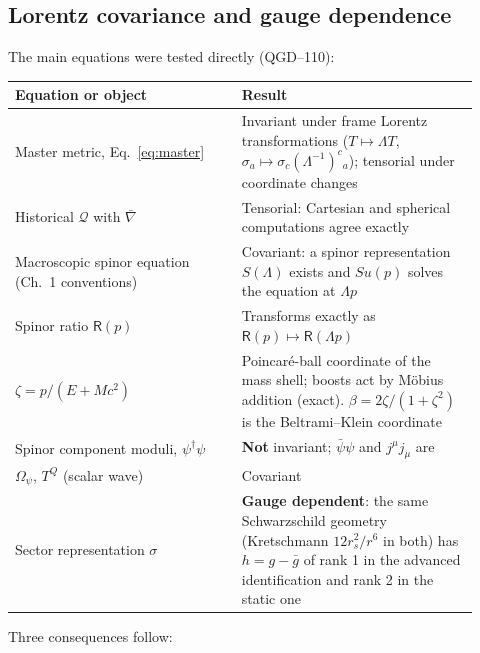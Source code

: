 \documentclass[11pt,a4paper]{article}
\begin{document}
\subsection{Lorentz covariance and gauge dependence}
The main equations were tested directly (QGD--110):
\begin{center}\small
\begin{tabular}{@{}p{0.45\linewidth}p{0.47\linewidth}@{}}\toprule
Equation or object & Result\\\midrule
Master metric, Eq.~\eqref{eq:master} & Invariant under frame Lorentz transformations ($T\mapsto\Lambda T$, $\sigma_a\mapsto\sigma_c(\Lambda^{-1})^c{}_a$); tensorial under coordinate changes\\
Historical $\mathcal Q$ with $\bar\nabla$ & Tensorial: Cartesian and spherical computations agree exactly\\
Macroscopic spinor equation (Ch.~1 conventions) & Covariant: a spinor representation $S(\Lambda)$ exists and $S u(p)$ solves the equation at $\Lambda p$\\
Spinor ratio $\mathsf R(p)$ & Transforms exactly as $\mathsf R(p)\mapsto\mathsf R(\Lambda p)$\\
$\zeta=p/(E+Mc^2)$ & Poincar\'e-ball coordinate of the mass shell; boosts act by M\"obius addition (exact). $\beta=2\zeta/(1+\zeta^2)$ is the Beltrami--Klein coordinate\\
Spinor component moduli, $\psi^\dagger\psi$ & \textbf{Not} invariant; $\bar\psi\psi$ and $j^\mu j_\mu$ are\\
$\Omega_\psi$, $T^Q$ (scalar wave) & Covariant\\
Sector representation $\sigma$ & \textbf{Gauge dependent}: the same Schwarzschild geometry (Kretschmann $12r_s^2/r^6$ in both) has $h=g-\bar g$ of rank 1 in the advanced identification and rank 2 in the static one\\\bottomrule
\end{tabular}
\end{center}
\noindent Three consequences follow:
\end{document}
